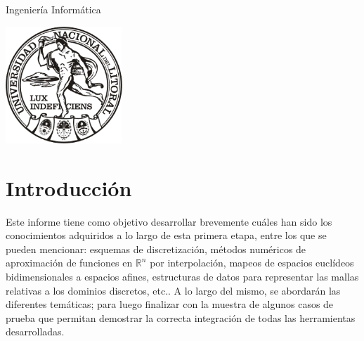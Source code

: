 \begin{titlepage}


  {\large
    Ingeniería Informática}\\[1cm] %
  
  \begin{center}
    \includegraphics[width=0.33\textwidth]{logo_unl.eps}\\[1cm] %
  \end{center}

  \vfill %
\end{titlepage}



\section{Introducción}

Este informe tiene como objetivo desarrollar brevemente cuáles han
sido los conocimientos adquiridos a lo largo de esta primera etapa, entre los que se pueden mencionar: esquemas de discretización, métodos
numéricos de aproximación de funciones en $\mathbb{R}^n$ por interpolación, mapeos de espacios euclídeos bidimensionales a espacios afines, estructuras de datos para representar las mallas relativas a los dominios discretos, etc.. A lo largo del mismo, se abordarán las diferentes temáticas; para luego finalizar con la muestra de algunos casos de prueba que permitan demostrar la correcta integración de todas las herramientas desarrolladas.



